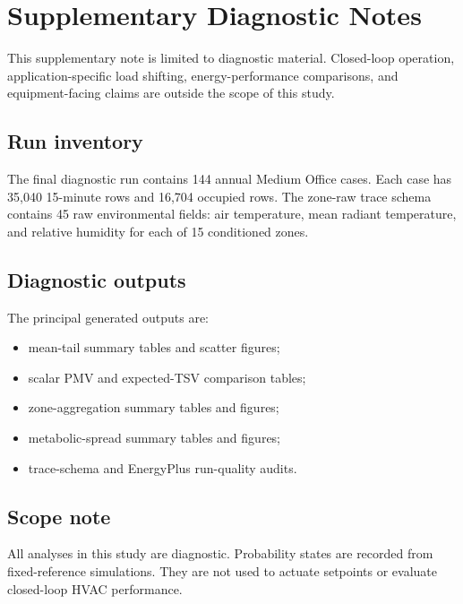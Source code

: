 \section{Supplementary Diagnostic Notes}\label{appendix}

This supplementary note is limited to diagnostic material. Closed-loop operation, application-specific load shifting, energy-performance comparisons, and equipment-facing claims are outside the scope of this study.

\subsection{Run inventory}

The final diagnostic run contains 144 annual Medium Office cases. Each case has 35{,}040 15-minute rows and 16{,}704 occupied rows. The zone-raw trace schema contains 45 raw environmental fields: air temperature, mean radiant temperature, and relative humidity for each of 15 conditioned zones.

\subsection{Diagnostic outputs}

The principal generated outputs are:
\begin{itemize}
    \item mean-tail summary tables and scatter figures;
    \item scalar PMV and expected-TSV comparison tables;
    \item zone-aggregation summary tables and figures;
    \item metabolic-spread summary tables and figures;
    \item trace-schema and EnergyPlus run-quality audits.
\end{itemize}

\subsection{Scope note}

All analyses in this study are diagnostic. Probability states are recorded from fixed-reference simulations. They are not used to actuate setpoints or evaluate closed-loop HVAC performance.
